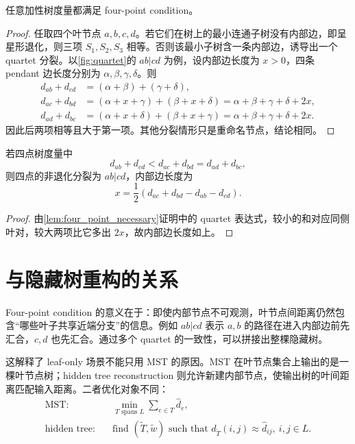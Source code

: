 \begin{lemma}
\label{lem:four_point_necessary}
任意加性树度量都满足 four-point condition。
\end{lemma}

\begin{proof}
任取四个叶节点 $a,b,c,d$。若它们在树上的最小连通子树没有内部边，即呈星形退化，则三项 $S_1,S_2,S_3$ 相等。否则该最小子树含一条内部边，诱导出一个 quartet 分裂。以\cref{fig:quartet}的 $ab|cd$ 为例，设内部边长度为 $x>0$，四条 pendant 边长度分别为 $\alpha,\beta,\gamma,\delta$。则
\begin{align}
  d_{ab}+d_{cd} &= (\alpha+\beta)+(\gamma+\delta),\\
  d_{ac}+d_{bd} &= (\alpha+x+\gamma)+(\beta+x+\delta)
                 = \alpha+\beta+\gamma+\delta+2x,\\
  d_{ad}+d_{bc} &= (\alpha+x+\delta)+(\beta+x+\gamma)
                 = \alpha+\beta+\gamma+\delta+2x.
\end{align}
因此后两项相等且大于第一项。其他分裂情形只是重命名节点，结论相同。
\end{proof}

\begin{proposition}
\label{prop:quartet_split}
若四点树度量中
\begin{equation}
  d_{ab}+d_{cd} < d_{ac}+d_{bd}=d_{ad}+d_{bc},
\end{equation}
则四点的非退化分裂为 $ab|cd$，内部边长度为
\begin{equation}
  x=\frac{1}{2}\left(d_{ac}+d_{bd}-d_{ab}-d_{cd}\right).
\end{equation}
\end{proposition}

\begin{proof}
由\cref{lem:four_point_necessary}证明中的 quartet 表达式，较小的和对应同侧叶对，较大两项比它多出 $2x$，故内部边长度如上。
\end{proof}

\section{与隐藏树重构的关系}

Four-point condition 的意义在于：即使内部节点不可观测，叶节点间距离仍然包含“哪些叶子共享近端分支”的信息。例如 $ab|cd$ 表示 $a,b$ 的路径在进入内部边前先汇合，$c,d$ 也先汇合。通过多个 quartet 的一致性，可以拼接出整棵隐藏树。

这解释了 leaf-only 场景不能只用 MST 的原因。MST 在叶节点集合上输出的是一棵叶节点树；hidden tree reconstruction 则允许新建内部节点，使输出树的叶间距离匹配输入距离。二者优化对象不同：
\begin{align}
  \text{MST:}\quad &\min_{T\text{ spans }L}\sum_{e\in T}\widehat d_e,\\
  \text{hidden tree:}\quad &\text{find }(\widetilde T,\widetilde w)\text{ such that }
  d_{\widetilde T}(i,j)\approx \widehat d_{ij},\ i,j\in L.
\end{align}

